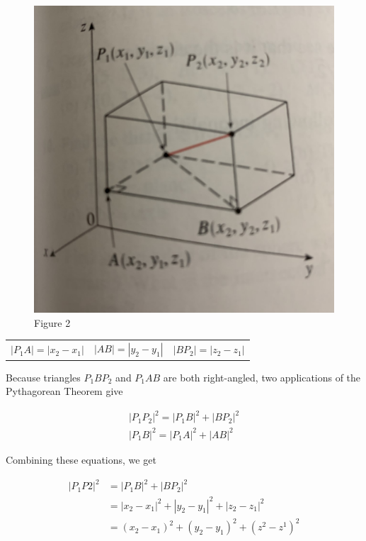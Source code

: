 \documentclass{article}
\begin{document}
            \begin{figure}[h]
                \centering
                \includegraphics[scale=0.1]{Resources/Unit3Vectors/Fig2.jpg}
                \caption*{Figure 2}
            \end{figure}

            \begin{center}
                \begin{tabular}{ccc}
                    $|P_1A|=|x_2-x_1|$
                    &  $|AB|=|y_2-y_1|$
                    &  $|BP_2|=|z_2-z_1|$
                \end{tabular}
            \end{center}

            \noindent Because triangles $P_1BP_2$ and $P_1AB$ are both right-angled, two applications
            of the Pythagorean Theorem give

            \begin{align*}
                |P_1P_2|^2=|P_1B|^2+|BP_2|^2 \\
                |P_1B|^2=|P_1A|^2+|AB|^2
            \end{align*}

            \noindent Combining these equations, we get

            \begin{align*}
                |P_1P2|^2 &= |P_1B|^2+|BP_2|^2\\
                &= |x_2-x_1|^2+|y_2-y_1|^2+|z_2-z_1|^2\\
                &= (x_2-x_1)^2+(y_2-y_1)^2+(z^2-z^1)^2
            \end{align*}
\end{document}
